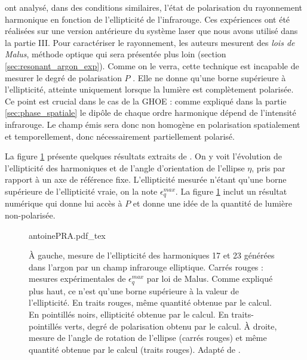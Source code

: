  ont analysé, dans des conditions similaires, l'état de polarisation du rayonnement harmonique en fonction de l'ellipticité de l'infrarouge. Ces expériences ont été réalisées sur une version antérieure du système laser que nous avons utilisé dans la partie III. Pour caractériser le rayonnement, les auteurs mesurent des \textit{lois de Malus}, méthode optique qui sera présentée plus loin (section \ref{sec:resonant_argon_exp}). Comme on le verra, cette technique est incapable de mesurer le degré de polarisation $P$ . Elle ne donne qu'une borne supérieure à l'ellipticité, atteinte uniquement lorsque la lumière est complètement polarisée. Ce point est crucial dans le cas de la GHOE : comme expliqué dans la partie \ref{sec:phase_spatiale} le dipôle de chaque ordre harmonique dépend de l'intensité infrarouge. Le champ émis sera donc non homogène en polarisation spatialement et temporellement, donc nécessairement partiellement polarisé.

La figure \ref{fig:antoinepra} présente quelques résultats extraits de . On y voit l'évolution de l'ellipticité des harmoniques et de l'angle d'orientation de l'ellipse $\eta$, pris par rapport à un axe de référence fixe. L'ellipticité mesurée n'étant qu'une borne supérieure de l'ellipticité vraie, on la note $\epsilon^{max}_q$. La figure \ref{fig:antoinepra} inclut un résultat numérique qui donne lui accès à $P$ et donne une idée de la quantité de lumière non-polarisée.

\begin{figure}[!ht]
\centering
\def\svgwidth{\columnwidth}
{antoinePRA.pdf_tex}
\caption{\`{A} gauche, mesure de l'ellipticité des harmoniques 17 et 23 générées dans l'argon par un champ infrarouge elliptique. Carrés rouges : mesures expérimentales de $\epsilon^{max}_q$ par loi de Malus. Comme expliqué plus haut, ce n'est qu'une borne supérieure à la valeur de l'ellipticité. En traits rouges, même quantité obtenue par le calcul. En pointillés noirs, ellipticité obtenue par le calcul. En traits-pointillés verts, degré de polarisation obtenu par le calcul. \`{A} droite, mesure de l'angle de rotation de l'ellipse (carrés rouges) et même quantité obtenue par le calcul (traits rouges). Adapté de .}
\label{fig:antoinepra}
\end{figure}

